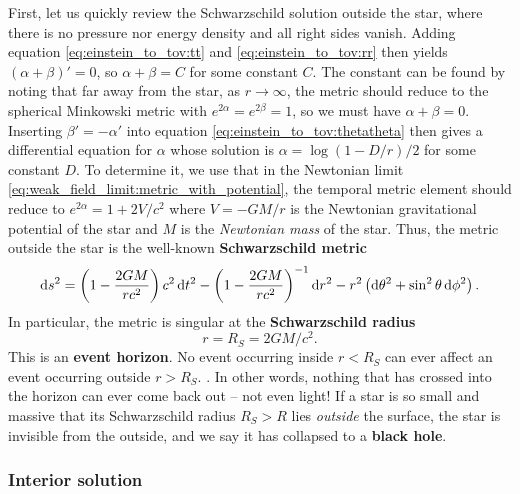 First, let us quickly review the Schwarzschild solution outside the star, where there is no pressure nor energy density and all right sides vanish.
Adding equation \eqref{eq:einstein_to_tov:tt} and \eqref{eq:einstein_to_tov:rr} then yields $(\alpha + \beta)' = 0$, so $\alpha + \beta = C$ for some constant $C$.
The constant can be found by noting that far away from the star, as $r \rightarrow \infty$, the metric should reduce to the spherical Minkowski metric with $e^{2\alpha} = e^{2 \beta} = 1$, so we must have $\alpha + \beta = 0$.
Inserting $\beta' = -\alpha'$ into equation \eqref{eq:einstein_to_tov:thetatheta} then gives a differential equation for $\alpha$ whose solution is $\alpha = \log \left( 1 - D / r \right) / 2$ for some constant $D$.
To determine it, we use that in the Newtonian limit \eqref{eq:weak_field_limit:metric_with_potential}, the temporal metric element should reduce to $e^{2 \alpha} = 1 + 2 V / c^2$ where $V = - G M / r$ is the Newtonian gravitational potential of the star and $M$ is the \emph{Newtonian mass} of the star.
Thus, the metric outside the star is the well-known \textbf{Schwarzschild metric}
\begin{equation}
	\mathop{}\!\mathrm{d} s^2 = \left( 1 - \frac{2 G M}{r c^2} \right) c^2 \mathop{}\!\mathrm{d} t^2 - \left( 1 - \frac{2 G M}{r c^2} \right)^{-1} \mathop{}\!\mathrm{d} r^2 - r^2 \left( \mathop{}\!\mathrm{d} \theta^2 + \sin^2 \theta \mathop{}\!\mathrm{d} \phi^2 \right) .
\label{eq:tov:schwarzschild_metric}
\end{equation}
In particular, the metric is singular at the \textbf{Schwarzschild radius}
\begin{equation}
	r = R_S = 2 G M / c^2.
\label{eq:tov:schwarzschild_radius}
\end{equation}
This is an \textbf{event horizon}.
No event occurring inside $r < R_S$ can ever affect an event occurring outside $r > R_S$. \cite[section 5.6]{ref:carroll}.
In other words, nothing that has crossed into the horizon can ever come back out -- not even light!
If a star is so small and massive that its Schwarzschild radius $R_S > R$ lies \emph{outside} the surface, the star is invisible from the outside, and we say it has collapsed to a \textbf{black hole}.

\subsubsection{Interior solution}

